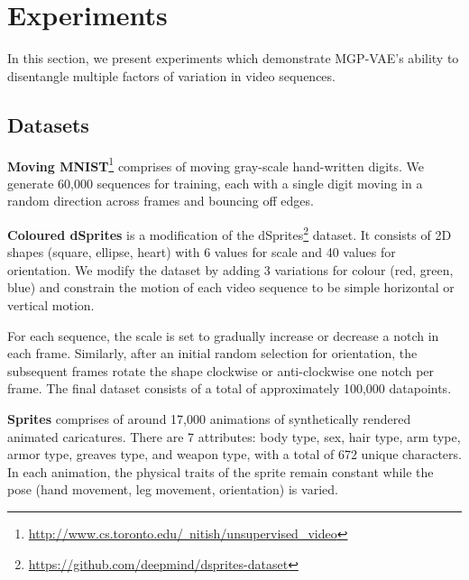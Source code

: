 \documentclass[runningheads]{llncs}
\begin{document}
   \section{Experiments}
   In this section, we present experiments which demonstrate MGP-VAE's ability to disentangle multiple factors of variation in video sequences. \par
   
   \subsection{Datasets}
    
    \textbf{Moving MNIST}\footnote{\href{http://www.cs.toronto.edu/~nitish/unsupervised\_video}{http://www.cs.toronto.edu/~nitish/unsupervised\_video}} \cite{mmnist} comprises of moving gray-scale hand-written digits. We generate 60,000 sequences for training, each with a single digit moving in a random direction across frames and bouncing off edges. \par
   
    \noindent \textbf{Coloured dSprites} is a modification of the dSprites\footnote{\href{https://github.com/deepmind/dsprites-dataset}{https://github.com/deepmind/dsprites-dataset}} \cite{Higgins2017betaVAELB} dataset. It consists of 2D shapes (square, ellipse, heart) with 6 values for scale and 40 values for orientation. We modify the dataset by adding 3 variations for colour (red, green, blue) and constrain the motion of each video sequence to be simple horizontal or vertical motion. \par 

   For each sequence, the scale is set to gradually increase or decrease a notch in each frame. Similarly, after an initial random selection for orientation, the subsequent frames rotate the shape clockwise or anti-clockwise one notch per frame. The final dataset consists of a total of approximately 100,000 datapoints. \par

   \noindent \textbf{Sprites} \cite{Reed2015DeepVA} comprises of around 17,000 animations of synthetically rendered animated caricatures. There are 7 attributes: body type, sex, hair type, arm type, armor type, greaves type, and weapon type, with a total of 672 unique characters. In each animation, the physical traits of the sprite remain constant while the pose (hand movement, leg movement, orientation) is varied. \par
   
\end{document}
